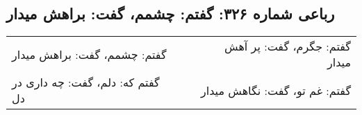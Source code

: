\begin{center}
\section*{رباعی شماره ۳۲۶: گفتم: چشمم، گفت: براهش میدار}
\label{sec:sh326}
\begin{longtable}{l p{0.5cm} r}
گفتم: چشمم، گفت: براهش میدار
&&
گفتم: جگرم، گفت: پر آهش میدار
\\
گفتم که: دلم، گفت: چه داری در دل
&&
گفتم: غم تو، گفت: نگاهش میدار
\\
\end{longtable}
\end{center}
